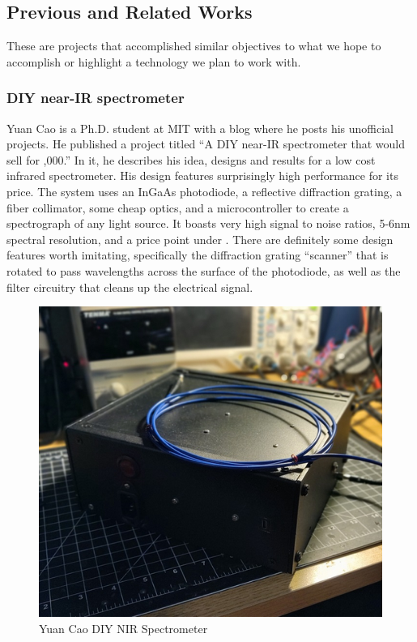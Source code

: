 \subsection{Previous and Related Works}
These are projects that accomplished similar objectives to what we hope to accomplish or highlight a technology we plan to work with.
\subsubsection{DIY near-IR spectrometer}
Yuan Cao is a Ph.D. student at MIT with a blog where he posts his unofficial projects. He published a project titled “A  DIY near-IR spectrometer that would sell for ,000.” In it, he describes his idea, designs and results for a low cost infrared spectrometer. His design features surprisingly high performance for its price. The system uses an InGaAs photodiode, a reflective diffraction grating, a fiber collimator, some cheap optics, and a microcontroller to create a spectrograph of any light source. It boasts very high signal to noise ratios, 5-6nm spectral resolution, and a price point under . There are definitely some design features worth imitating, specifically the diffraction grating “scanner” that is rotated to pass wavelengths across the surface of the photodiode, as well as the filter circuitry that cleans up the electrical signal. 
\begin{figure}[H]
    \caption{Yuan Cao DIY NIR Spectrometer}
    \centering
    \includegraphics[width=\textwidth]{images/3-1-1Pic.png}
\end{figure}
